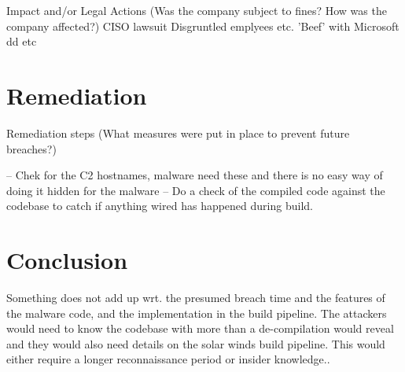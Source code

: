 \documentclass[
	letterpaper, %
	10pt, %
	unnumberedsections, %
	twoside, %
]{LTJournalArticle}
\begin{document}
Impact and/or Legal Actions (Was the company subject to fines? How was the company affected?)
CISO lawsuit
Disgruntled emplyees etc.
'Beef' with Microsoft  dd
etc



\section{Remediation} 
Remediation steps (What measures were put in place to prevent future breaches?)

-- Chek for the C2 hostnames, malware need these and there is no easy way of doing it hidden for the malware
-- Do a check of the compiled code against the codebase to catch if anything wired has happened during build.

\section{Conclusion}
Something does not add up wrt. the presumed breach time and the features of the malware code, and the implementation in the build pipeline. The attackers would need to know the codebase with more than a de-compilation would reveal and they would also need details on the solar winds build pipeline. This would either require a longer reconnaissance period or insider knowledge..  


\printbibliography %




\end{document}
